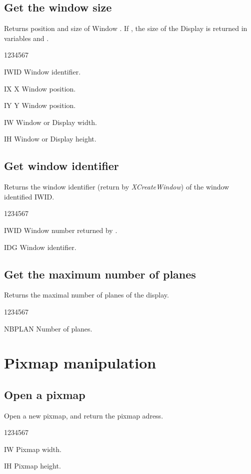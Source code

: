 \subsection{Get the window size}
%
\Action
Returns position and size of Window .
If , the size of the Display is returned in
variables  and .
\Pdesc
\begin{DLtt}{1234567}
\item[IWID] Window identifier.
\item[IX] X Window position.
\item[IY] Y Window position.
\item[IW] Window or Display width.
\item[IH] Window or Display height.
\end{DLtt}



\subsection{Get window identifier}
%
\Action
Returns the  window identifier (return by {\em XCreateWindow})
of the window identified IWID.
\Pdesc
\begin{DLtt}{1234567}
\item[IWID] Window number returned by .
\item[IDG] Window identifier.
\end{DLtt}
\subsection{Get the maximum number of planes}
%
\Action
Returns the maximal number of planes of the display.
\Pdesc
\begin{DLtt}{1234567}
\item[NBPLAN] Number of planes.
\end{DLtt}
%

\section{Pixmap manipulation}
\subsection{Open a pixmap}
%
\Action
Open a new pixmap, and return the pixmap adress.
\Pdesc
\begin{DLtt}{1234567}
\item[IW] Pixmap width.
\item[IH] Pixmap height.
\end{DLtt}



